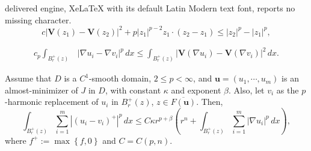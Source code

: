 \documentclass[10pt,a4paper]{amsart}
\begin{document}
delivered engine, XeLaTeX with its default Latin Modern text font, reports no missing character.
\begin{equation}
\label{Fi-4}
c \left|\mathbf{V}(z_1)-\mathbf{V}(z_2) \right|^2 + p  |z_1|^{p-2} z_1 \cdot (z_2-z_1) \leq   |z_2|^p-|z_1|^p,
\end{equation}

\begin{align}\label{G-inequality}
c_p \int_{B_r^+(z)} & |\nabla u_i - \nabla v_i|^p \, dx
\leq \int_{B_r^+(z)} \left| \mathbf{V}(\nabla u_i)-\mathbf{V}(\nabla v_i) \right|^2 \, dx. %
\end{align}

\begin{proposition}
\label{Lemma10.1}
Assume that $D$ is a %
$C^1$-smooth domain, $2\le p<\infty$, and  $\mathbf{u}=(u_1, \cdots, u_m)$ is  an almost-minimizer of $J$ in $D$, with constant $\kappa$ and exponent $\beta$. Also, let $v_i$ as the $p$-harmonic replacement of $u_i$ in $B_{r}^+(z)$, $z \in \overline{F(\mathbf{u})}$. Then,
\begin{equation}
\label{Eq-Lemma10.1}
\int_{B_{r}^+(z)} \sum_{i=1}^{m} \left| \left(u_i-v_i \right)^+ \right|^p \, dx \leq C \kappa r^{p+\beta} \left( r^n + \int_{B_r^+(z)} \sum_{i=1}^{m} |\nabla u_i|^p \, dx \right),
\end{equation}
where  $f^+:=\max \left\{f,0 \right\}$ and 
$C= C(p, n)$.
\end{proposition}
\end{document}
